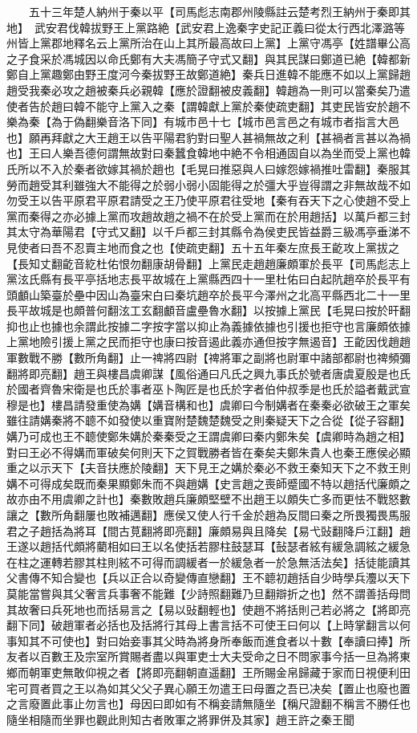 　　五十三年楚人納州于秦以平【司馬彪志南郡州陵縣註云楚考烈王納州于秦即其地】　武安君伐韓拔野王上黨路絶【武安君上逸秦字史記正義曰從太行西北澤潞等州皆上黨郡地釋名云上黨所治在山上其所最高故曰上黨】上黨守馮亭【姓譜畢公高之子食采於馮城因以命氏鄭有大夫馮簡子守式又翻】與其民謀曰鄭道已絶【韓都新鄭自上黨趣鄭由野王度河今秦拔野王故鄭道絶】秦兵日進韓不能應不如以上黨歸趙趙受我秦必攻之趙被秦兵必親韓【應於證翻被皮義翻】韓趙為一則可以當秦矣乃遣使者告於趙曰韓不能守上黨入之秦【謂韓獻上黨於秦使疏吏翻】其吏民皆安於趙不樂為秦【為于偽翻樂音洛下同】有城市邑十七【城市邑言邑之有城市者指言大邑也】願再拜獻之大王趙王以告平陽君豹對曰聖人甚禍無故之利【甚禍者言甚以為禍也】王曰人樂吾德何謂無故對曰秦蠶食韓地中絶不令相通固自以為坐而受上黨也韓氏所以不入於秦者欲嫁其禍於趙也【毛晃曰推惡與人曰嫁怨嫁禍推吐雷翻】秦服其勞而趙受其利雖強大不能得之於弱小弱小固能得之於彊大乎豈得謂之非無故哉不如勿受王以告平原君平原君請受之王乃使平原君往受地【秦有吞天下之心使趙不受上黨而秦得之亦必據上黨而攻趙故趙之禍不在於受上黨而在於用趙括】以萬戶都三封其太守為華陽君【守式又翻】以千戶都三封其縣令為侯吏民皆益爵三級馮亭垂涕不見使者曰吾不忍賣主地而食之也【使疏吏翻】五十五年秦左庶長王齕攻上黨拔之【長知丈翻齕音紇杜佑恨勿翻康胡骨翻】上黨民走趙趙廉頗軍於長平【司馬彪志上黨泫氏縣有長平亭括地志長平故城在上黨縣西四十一里杜佑曰白起阬趙卒於長平有頭顱山築臺於壘中因山為臺宋白曰秦坑趙卒於長平今澤州之北高平縣西北二十一里長平故城是也頗普何翻泫工玄翻顱音盧壘魯水翻】以按據上黨民【毛晃曰按於旰翻抑也止也據也余謂此按據二字按字當以抑止為義據依據也引援也拒守也言廉頗依據上黨地險引援上黨之民而拒守也康曰按音遏此義亦通但按字無遏音】王齕因伐趙趙軍數戰不勝【數所角翻】止一禆將四尉【禆將軍之副將也尉軍中諸部都尉也禆頻彌翻將即亮翻】趙王與樓昌虞卿謀【風俗通曰凡氏之興九事氏於號者唐虞夏殷是也氏於國者齊魯宋衛是也氏於事者巫卜陶匠是也氏於字者伯仲叔季是也氏於謚者戴武宣穆是也】樓昌請發重使為媾【媾音構和也】虞卿曰今制媾者在秦秦必欲破王之軍矣雖往請媾秦將不聼不如發使以重寶附楚魏楚魏受之則秦疑天下之合從【從子容翻】媾乃可成也王不聼使鄭朱媾於秦秦受之王謂虞卿曰秦内鄭朱矣【虞卿時為趙之相】對曰王必不得媾而軍破矣何則天下之賀戰勝者皆在秦矣夫鄭朱貴人也秦王應侯必顯重之以示天下【夫音扶應於陵翻】天下見王之媾於秦必不救王秦知天下之不救王則媾不可得成矣既而秦果顯鄭朱而不與趙媾【史言趙之喪師蹙國不特以趙括代廉頗之故亦由不用虞卿之計也】秦數敗趙兵廉頗堅壁不出趙王以頗失亡多而更怯不戰怒數讓之【數所角翻屢也敗補邁翻】應侯又使人行千金於趙為反間曰秦之所畏獨畏馬服君之子趙括為將耳【間古莧翻將即亮翻】廉頗易與且降矣【易弋䜴翻降戶江翻】趙王遂以趙括代頗將藺相如曰王以名使括若膠柱鼓瑟耳【鼔瑟者絃有緩急調絃之緩急在柱之運轉若膠其柱則絃不可得而調緩者一於緩急者一於急無活法矣】括徒能讀其父書傳不知合變也【兵以正合以奇變傳直戀翻】王不聼初趙括自少時學兵灋以天下莫能當嘗與其父奢言兵事奢不能難【少詩照翻難乃旦翻辯折之也】然不謂善括母問其故奢曰兵死地也而括易言之【易以䜴翻輕也】使趙不將括則己若必將之【將即亮翻下同】破趙軍者必括也及括將行其母上書言括不可使王曰何以【上時掌翻言以何事知其不可使也】對曰始妾事其父時為將身所奉飯而進食者以十數【奉讀曰捧】所友者以百數王及宗室所賞賜者盡以與軍吏士大夫受命之日不問家事今括一旦為將東鄉而朝軍吏無敢仰視之者【將即亮翻朝直遥翻】王所賜金帛歸藏于家而日視便利田宅可買者買之王以為如其父父子異心願王勿遣王曰母置之吾已决矣【置止也廢也置之言廢置此事止勿言也】母因曰即如有不稱妾請無隨坐【稱尺證翻不稱言不勝任也隨坐相隨而坐罪也觀此則知古者敗軍之將罪併及其家】趙王許之秦王聞